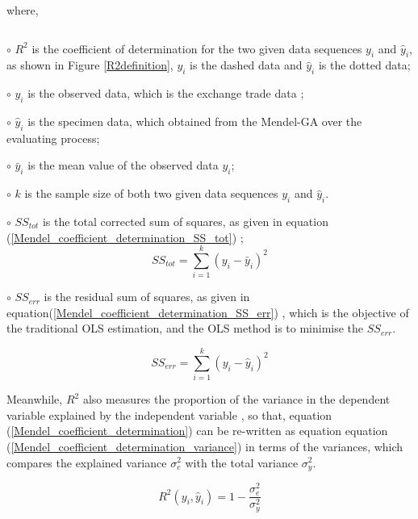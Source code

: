 where,
\begin{list}{$$}
%
\item $\circ$ $R^2$ is the coefficient of determination for the two given data sequences $y_i$ and $\hat{y}_i$, as shown in Figure \ref{R2definition}, $y_i$ is the dashed data and $\hat{y}_i$ is the dotted data;
%
\item $\circ$ $y_i$ is the observed data,
which is the exchange trade data \cite{Evans2002};
%
\item $\circ$ $\hat{y}_i$ is the specimen data,
which obtained from the Mendel-GA over the evaluating process;
%
\item $\circ$ $\bar{y}_i$ is the mean value of the observed data $y_i$;
%
\item $\circ$ $k$ is the sample size of both two given data sequences $y_i$ and $\hat{y}_i$.
%
\item $\circ$ $SS_{tot}$ is the total corrected sum of squares,
as given in equation (\ref{Mendel_coefficient_determination_SS_tot})
\cite{Gujarati2004,Montgomery2003};
%
\begin{equation}
SS_{tot} = \sum\limits_{i = 1}^k{ \left( y_i - \bar{y}_i \right)^2}
\label{Mendel_coefficient_determination_SS_tot}
\end{equation}
%
\item $\circ$ $SS_{err}$ is the residual sum of squares,
as given in equation(\ref{Mendel_coefficient_determination_SS_err})
\cite{Gujarati2004,Montgomery2003}, which is the objective of
the traditional OLS estimation, and the OLS method is to minimise
the $SS_{err}$.

%
\begin{equation}
SS_{err} = \sum\limits_{i = 1}^k{ \left( y_i - \hat{y}_i \right)^2}
\label{Mendel_coefficient_determination_SS_err}
\end{equation}
%
\end{list}


Meanwhile, $R^2$ also measures the
proportion of the variance in the dependent variable explained by
the independent variable \cite{Allen2007}, so that, equation (\ref{Mendel_coefficient_determination}) can be re-written as equation equation (\ref{Mendel_coefficient_determination_variance}) in terms of the variances, which compares the
explained variance $\sigma^2_{e}$
with the total variance $\sigma^2_{y}$.

\begin{equation}
R^2 \left( y_i,\hat{y}_i \right)  = 1 - \displaystyle
\frac{\sigma^2_{e}}{\sigma^2_{y}} 
\label{Mendel_coefficient_determination_variance}
\end{equation}

